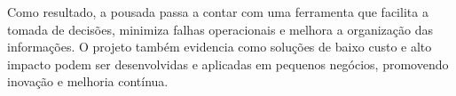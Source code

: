 \documentclass[
	12pt,				%
	openany,			%
	twoside,			%
	a4paper,			%
	english,			%
	french,				%
	spanish,			%
	brazil				%
	]{abntex2}
\begin{document}
Como resultado, a pousada passa a contar com uma ferramenta que facilita a tomada de decisões, minimiza falhas operacionais e melhora a organização das informações. O projeto também evidencia como soluções de baixo custo e alto impacto podem ser desenvolvidas e aplicadas em pequenos negócios, promovendo inovação e melhoria contínua.


\postextual



%
%

\end{document}
